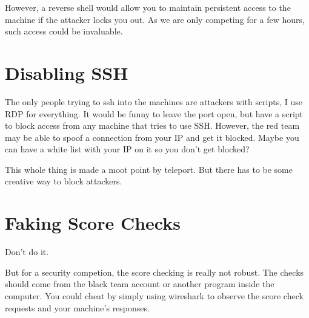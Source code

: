 \documentclass{article}
\begin{document}
However, a reverse shell would allow you to maintain persistent access to the machine if the attacker locks you out.
As we are only competing for a few hours, such access could be invaluable.

\section{Disabling SSH}
The only people trying to ssh into the machines are attackers with scripts, I use RDP for everything.
It would be funny to leave the port open, but have a script to block access from any machine that tries to use SSH.
However, the red team may be able to spoof a connection from your IP and get it blocked.
Maybe you can have a white list with your IP on it so you don't get blocked?

This whole thing is made a moot point by teleport. But there has to be some creative way to block attackers.

\section{Faking Score Checks}
Don't do it.

But for a security competion, the score checking is really not robust. 
The checks should come from the black team account or another program inside the computer.
You could cheat by simply using wireshark to observe the score check requests and your machine's responses.
\end{document}
